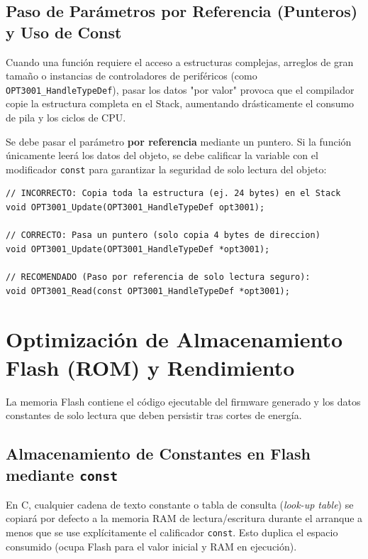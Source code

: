 \documentclass[
10pt, %
a4paper, %
oneside, %
headinclude,footinclude, %
BCOR5mm, %
]{scrartcl}
\begin{document}
\subsection{Paso de Parámetros por Referencia (Punteros) y Uso de Const}
Cuando una función requiere el acceso a estructuras complejas, arreglos de gran tamaño o instancias de controladores de periféricos (como \texttt{OPT3001\_HandleTypeDef}), pasar los datos "por valor" provoca que el compilador copie la estructura completa en el Stack, aumentando drásticamente el consumo de pila y los ciclos de CPU.

Se debe pasar el parámetro \textbf{por referencia} mediante un puntero. Si la función únicamente leerá los datos del objeto, se debe calificar la variable con el modificador \texttt{const} para garantizar la seguridad de solo lectura del objeto:

\begin{lstlisting}[style=CMakeStyle]
// INCORRECTO: Copia toda la estructura (ej. 24 bytes) en el Stack
void OPT3001_Update(OPT3001_HandleTypeDef opt3001);

// CORRECTO: Pasa un puntero (solo copia 4 bytes de direccion)
void OPT3001_Update(OPT3001_HandleTypeDef *opt3001);

// RECOMENDADO (Paso por referencia de solo lectura seguro):
void OPT3001_Read(const OPT3001_HandleTypeDef *opt3001);
\end{lstlisting}

\newpage
\section{Optimización de Almacenamiento Flash (ROM) y Rendimiento}

La memoria Flash contiene el código ejecutable del firmware generado y los datos constantes de solo lectura que deben persistir tras cortes de energía.

\subsection{Almacenamiento de Constantes en Flash mediante \texttt{const}}
En C, cualquier cadena de texto constante o tabla de consulta (\textit{look-up table}) se copiará por defecto a la memoria RAM de lectura/escritura durante el arranque a menos que se use explícitamente el calificador \texttt{const}. Esto duplica el espacio consumido (ocupa Flash para el valor inicial y RAM en ejecución).
\end{document}
